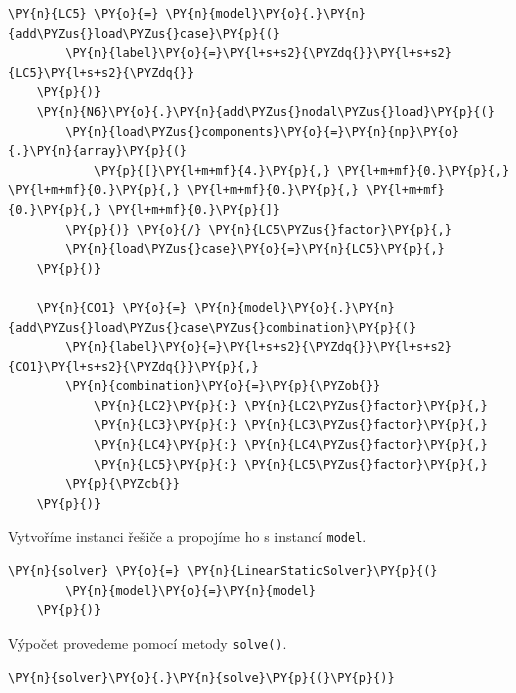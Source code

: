 \begin{tcolorbox}[breakable, size=fbox, boxrule=1pt, pad at break*=1mm,colback=cellbackground, colframe=cellborder]
\begin{Verbatim}[commandchars=\\\{\}]
    \PY{n}{LC5} \PY{o}{=} \PY{n}{model}\PY{o}{.}\PY{n}{add\PYZus{}load\PYZus{}case}\PY{p}{(}
        \PY{n}{label}\PY{o}{=}\PY{l+s+s2}{\PYZdq{}}\PY{l+s+s2}{LC5}\PY{l+s+s2}{\PYZdq{}}
    \PY{p}{)}
    \PY{n}{N6}\PY{o}{.}\PY{n}{add\PYZus{}nodal\PYZus{}load}\PY{p}{(}
        \PY{n}{load\PYZus{}components}\PY{o}{=}\PY{n}{np}\PY{o}{.}\PY{n}{array}\PY{p}{(}
            \PY{p}{[}\PY{l+m+mf}{4.}\PY{p}{,} \PY{l+m+mf}{0.}\PY{p}{,} \PY{l+m+mf}{0.}\PY{p}{,} \PY{l+m+mf}{0.}\PY{p}{,} \PY{l+m+mf}{0.}\PY{p}{,} \PY{l+m+mf}{0.}\PY{p}{]}
        \PY{p}{)} \PY{o}{/} \PY{n}{LC5\PYZus{}factor}\PY{p}{,}
        \PY{n}{load\PYZus{}case}\PY{o}{=}\PY{n}{LC5}\PY{p}{,}
    \PY{p}{)}
    
    \PY{n}{CO1} \PY{o}{=} \PY{n}{model}\PY{o}{.}\PY{n}{add\PYZus{}load\PYZus{}case\PYZus{}combination}\PY{p}{(}
        \PY{n}{label}\PY{o}{=}\PY{l+s+s2}{\PYZdq{}}\PY{l+s+s2}{CO1}\PY{l+s+s2}{\PYZdq{}}\PY{p}{,}
        \PY{n}{combination}\PY{o}{=}\PY{p}{\PYZob{}}
            \PY{n}{LC2}\PY{p}{:} \PY{n}{LC2\PYZus{}factor}\PY{p}{,}
            \PY{n}{LC3}\PY{p}{:} \PY{n}{LC3\PYZus{}factor}\PY{p}{,}
            \PY{n}{LC4}\PY{p}{:} \PY{n}{LC4\PYZus{}factor}\PY{p}{,}
            \PY{n}{LC5}\PY{p}{:} \PY{n}{LC5\PYZus{}factor}\PY{p}{,}
        \PY{p}{\PYZcb{}}
    \PY{p}{)}
    \end{Verbatim}
\end{tcolorbox}

Vytvoříme instanci řešiče a propojíme ho s instancí \texttt{model}.
\begin{tcolorbox}[breakable, size=fbox, boxrule=1pt, pad at break*=1mm,colback=cellbackground, colframe=cellborder]
    \begin{Verbatim}[commandchars=\\\{\}]
    \PY{n}{solver} \PY{o}{=} \PY{n}{LinearStaticSolver}\PY{p}{(}
        \PY{n}{model}\PY{o}{=}\PY{n}{model}
    \PY{p}{)}
    \end{Verbatim}
\end{tcolorbox}

Výpočet provedeme pomocí metody \texttt{solve()}.
\begin{tcolorbox}[breakable, size=fbox, boxrule=1pt, pad at break*=1mm,colback=cellbackground, colframe=cellborder]
    \begin{Verbatim}[commandchars=\\\{\}]
    \PY{n}{solver}\PY{o}{.}\PY{n}{solve}\PY{p}{(}\PY{p}{)}
    \end{Verbatim}
\end{tcolorbox}

